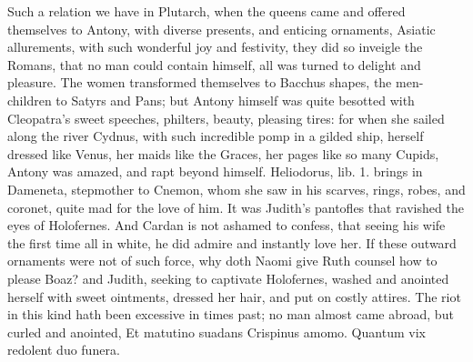 {Such a relation we have in Plutarch, when the queens came and
offered themselves to Antony, with diverse presents, and enticing
ornaments, Asiatic allurements, with such wonderful joy and festivity,
they did so inveigle the Romans, that no man could contain himself, all
was turned to delight and pleasure. The women transformed themselves to
Bacchus shapes, the men-children to Satyrs and Pans; but Antony himself
was quite besotted with Cleopatra's sweet speeches, philters, beauty,
pleasing tires: for when she sailed along the river Cydnus, with such
incredible pomp in a gilded ship, herself dressed like Venus, her maids
like the Graces, her pages like so many Cupids, Antony was amazed, and
rapt beyond himself. Heliodorus, lib. 1. brings in Dameneta, stepmother
to Cnemon, whom she saw in his scarves, rings, robes, and
coronet, quite mad for the love of him. It was Judith's pantofles that
ravished the eyes of Holofernes. And Cardan is not ashamed to
confess, that seeing his wife the first time all in white, he did
admire and instantly love her. If these outward ornaments were not of
such force, why doth Naomi give Ruth counsel how to please Boaz?
and Judith, seeking to captivate Holofernes, washed and anointed
herself with sweet ointments, dressed her hair, and put on costly
attires. The riot in this kind hath been excessive in times past; no
man almost came abroad, but curled and anointed,
Et matutino suadans Crispinus amomo.
Quantum vix redolent duo funera.

}
